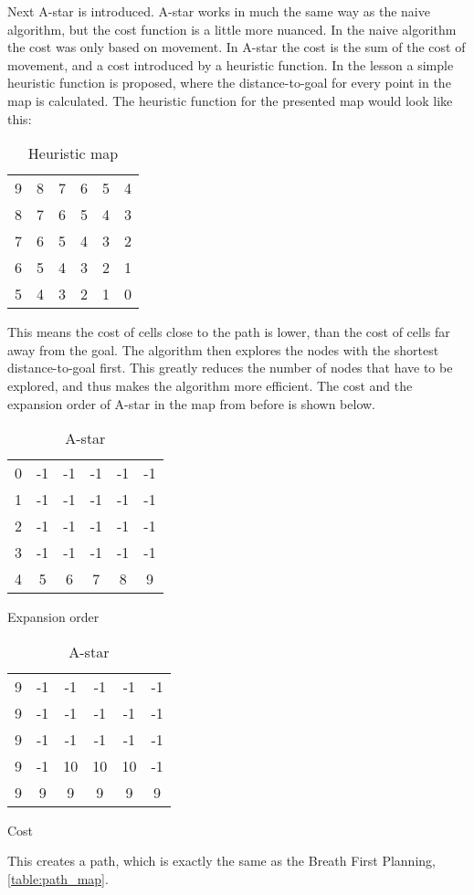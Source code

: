 \documentclass[Main]{subfiles}
\begin{document}
Next A-star is introduced. 
A-star works in much the same way as the naive algorithm, but the cost function is a little more nuanced.
In the naive algorithm the cost was only based on movement. 
In A-star the cost is the sum of the cost of movement, and a cost introduced by a heuristic function. 
In the lesson a simple heuristic function is proposed, where the distance-to-goal for every point in the map is calculated. 
The heuristic function for the presented map would look like this:
\begin{table}[H]
	\centering
	\begin{tabular}{cccccc}
		9 & 8 & 7 & 6 & 5 & 4  \\ 
		8 & 7 & 6 & 5 & 4 & 3  \\ 
		7 & 6 & 5 & 4 & 3 & 2  \\ 
		6 & 5 & 4 & 3 & 2 & 1  \\  
		5 & 4 & 3 & 2 & 1 & 0  \\ 
	\end{tabular}
\caption{Heuristic map}
\label{table:heuristic_map} 
\end{table} \noindent
This means the cost of cells close to the path is lower, than the cost of cells far away from the goal.
The algorithm then explores the nodes with the shortest distance-to-goal first. 
This greatly reduces the number of nodes that have to be explored, and thus makes the algorithm more efficient. 
The cost and the expansion order of A-star in the map from before is shown below.
\begin{table}[H]
	\begin{subtable}{0.5\linewidth}
		\centering
		\begin{tabular}{cccccc}
			0 & -1 & -1 & -1 & -1 & -1  \\ 
			1 & -1 & -1 & -1 & -1 & -1  \\ 
			2 & -1 & -1 & -1 & -1 & -1  \\ 
			3 & -1 & -1 & -1 & -1 & -1  \\  
			4 &  5 &  6 &  7 &  8 &  9  \\ 
		\end{tabular}
	\caption{Expansion order}
	\label{table:expansion_order_heuristic} 
	\end{subtable}
	\begin{subtable}{0.5\linewidth}
		\centering
		\begin{tabular}{cccccc}
			9 & -1 & -1 & -1 & -1 & -1  \\ 
			9 & -1 & -1 & -1 & -1 & -1  \\ 
			9 & -1 & -1 & -1 & -1 & -1  \\ 
			9 & -1 & 10 & 10 & 10 & -1  \\  
			9 &  9 &  9 &  9 &  9 &  9  \\ 
		\end{tabular}
	\caption{Cost}
	\label{table:cost_order_heuristic} 
	\end{subtable}
\caption{A-star}
\end{table} \noindent
This creates a path, which is exactly the same as the Breath First Planning, \autoref{table:path_map}.
\end{document}
